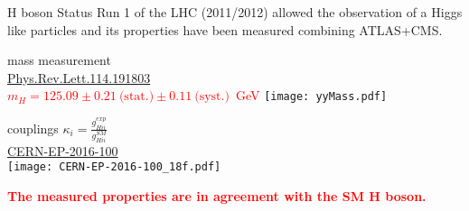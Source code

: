 \begin{frame}{H boson Status}
  Run 1 of the LHC (2011/2012) allowed the observation of a Higgs like particles and its properties have been measured combining ATLAS+CMS.
  \vfill
  \begin{minipage}[t]{0.59\linewidth}
    \centering
    mass measurement \\  \href{http://journals.aps.org/prl/pdf/10.1103/PhysRevLett.114.191803}{Phys.Rev.Lett.114.191803}\\
    \textcolor{red}{$m_H = 125.09 \pm 0.21~\text{(stat.)} \pm 0.11~\text{(syst.)} $~GeV}  
    \texttt{[image: yyMass.pdf]}
  \end{minipage}
  \hfill
  \begin{minipage}[t]{0.4\linewidth}
    \centering
    couplings $\kappa_i =\frac{g_{Hii}^{exp}}{g_{Hii}^{SM}}$ \\
    \href{https://cds.cern.ch/record/2158863}{CERN-EP-2016-100} \\
    \vfill
    \texttt{[image: CERN-EP-2016-100\_18f.pdf]} 
  \end{minipage}
\textcolor{red}{\bf The measured properties are in agreement with the SM H boson.}
\end{frame}
